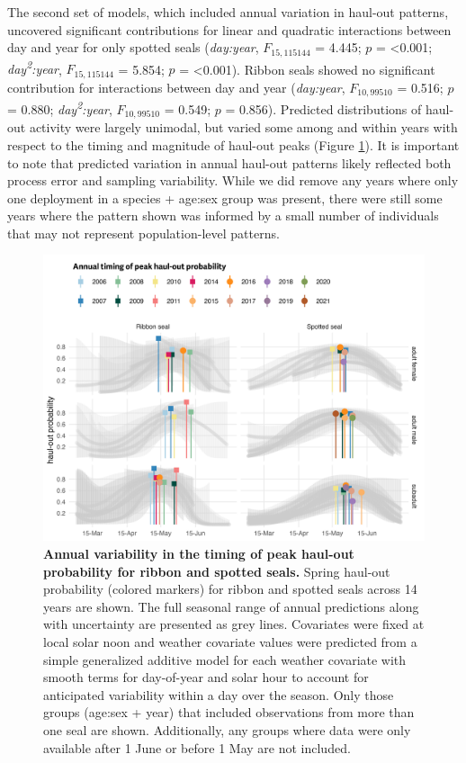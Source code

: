 \documentclass[fleqn,10pt,lineno]{wlpeerj} %
\begin{document}
The second set of models, which included annual variation in haul-out
patterns, uncovered significant contributions for linear and quadratic
interactions between day and year for only spotted seals (\emph{day:year},
\(F_{15,115144}\)
= 4.445; \(p\) =
\textless0.001; \emph{day\textsuperscript{2}:year},
\(F_{15,115144}\)
= 5.854; \(p\) =
\textless0.001). Ribbon seals showed no significant
contribution for interactions between day and year (\emph{day:year},
\(F_{10,99510}\)
= 0.516; \(p\) =
0.880; \emph{day\textsuperscript{2}:year},
\(F_{10,99510}\)
= 0.549; \(p\) =
0.856). Predicted distributions of
haul-out activity were largely unimodal, but varied some among and
within years with respect to the timing and magnitude of haul-out peaks
(Figure \ref{fig:annualHO}). It is important to note that predicted
variation in annual haul-out patterns likely reflected both process error
and sampling variability. While we did remove any years where only one
deployment in a species + age:sex group was present, there were still
some years where the pattern shown was informed by a small number of
individuals that may not represent population-level patterns.



\begin{figure}
\includegraphics[width=1\linewidth]{../figures/Figure-011} \caption{\textbf{Annual variability in the timing of peak haul-out probability for ribbon and spotted seals.} \linebreak Spring haul-out probability (colored markers) for ribbon and spotted seals across 14 years are shown. The full seasonal range of annual predictions along with uncertainty are presented as grey lines. Covariates were fixed at local solar noon and weather covariate values were predicted from a simple generalized additive model for each weather covariate with smooth terms for day-of-year and solar hour to account for anticipated variability within a day over the season. Only those groups (age:sex + year) that included observations from more than one seal are shown. Additionally, any groups where data were only available after 1 June or before 1 May are not included.}\label{fig:annualHO}
\end{figure}
\end{document}
